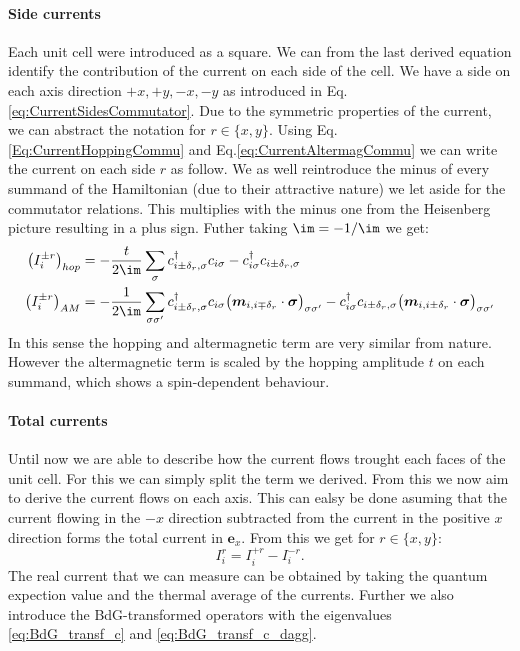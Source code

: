 \documentclass[../main.tex]{subfile}
\begin{document}
\paragraph{Side currents}
Each unit cell were introduced as a square. We can from the last derived equation identify the contribution of the current on each side of the cell. We have a side on 
each axis direction $+x, +y, -x, -y$ as introduced in Eq.\ref{eq:CurrentSidesCommutator}. Due to the symmetric properties of the current, we can abstract the notation
for $r\in\{x,y\}$. Using Eq.\ref{Eq:CurrentHoppingCommu} and Eq.\ref{eq:CurrentAltermagCommu} we can write the current on each side $r$ as follow.
We as well reintroduce the minus of every summand of the Hamiltonian (due to their attractive nature) we let aside for the commutator relations. This multiplies 
with the minus one from the Heisenberg picture resulting in a plus sign. Futher taking $\im = -1/\im$ we get:
\begin{align}
    \left(I_{i}^{\pm r}\right)_{hop} &= -\frac{t}{2\im}\sum_{\sigma}c_{i\pm\delta_r,\sigma}^{\dagger}c_{i\sigma} -c_{i\sigma}^{\dagger}c_{i\pm\delta_r,\sigma}  \\
    \left(I_{i}^{\pm r}\right)_{AM} &=  -\frac{1}{2\im}\sum_{\sigma\sigma'}c_{i\pm\delta_r,\sigma}^{\dagger}c_{i\sigma}\bigl(\bm{m}_{i,i\mp\delta_r}\cdot\bm{\sigma}\bigr)_{\sigma\sigma'} - c_{i\sigma}^{\dagger}c_{i\pm\delta_r,\sigma}\bigl(\bm{m}_{i,i\pm\delta_r}\cdot\bm{\sigma}\bigr)_{\sigma\sigma'} 
\end{align}
In this sense the hopping and altermagnetic term are very similar from nature. However the altermagnetic term is scaled by the hopping amplitude $t$ on each summand, 
which shows a spin-dependent behaviour.

\paragraph{Total currents}
Until now we are able to describe how the current flows trought each faces of the unit cell. For this we can simply split the term we derived.
From this we now aim to derive the current flows on each axis.
This can ealsy be done asuming that the current flowing in the $-x$ direction subtracted from the current in the positive $x$ direction forms the total current in $\bm{e}_x$.
From this we get for $r\in\{x,y\}$:
\[
    I_{i}^{r} = I_{i}^{+r} - I_{i}^{-r}.
\]
The real current that we can measure can be obtained by taking the quantum expection value and the thermal average of the currents. Further we also introduce the 
BdG-transformed operators with the eigenvalues \ref{eq:BdG_transf_c} and \ref{eq:BdG_transf_c_dagg}. \\
\end{document}
